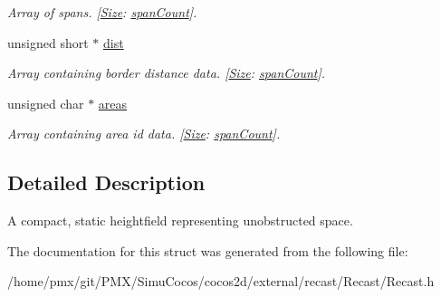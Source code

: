 \begin{DoxyCompactItemize}
\begin{DoxyCompactList}\small\item\em Array of spans. \mbox{[}\hyperlink{classSize}{Size}\+: \hyperlink{structrcCompactHeightfield_a7206a15efe8a9e2a8e28b8c7d89b45bd}{span\+Count}\mbox{]}. \end{DoxyCompactList}\item 
\mbox{\label{structrcCompactHeightfield_a91367763f0098a2966c4646ea676d880}} 
unsigned short $\ast$ \hyperlink{structrcCompactHeightfield_a91367763f0098a2966c4646ea676d880}{dist}
\begin{DoxyCompactList}\small\item\em Array containing border distance data. \mbox{[}\hyperlink{classSize}{Size}\+: \hyperlink{structrcCompactHeightfield_a7206a15efe8a9e2a8e28b8c7d89b45bd}{span\+Count}\mbox{]}. \end{DoxyCompactList}\item 
\mbox{\label{structrcCompactHeightfield_abacbf57f824f37c0d7af8268562df916}} 
unsigned char $\ast$ \hyperlink{structrcCompactHeightfield_abacbf57f824f37c0d7af8268562df916}{areas}
\begin{DoxyCompactList}\small\item\em Array containing area id data. \mbox{[}\hyperlink{classSize}{Size}\+: \hyperlink{structrcCompactHeightfield_a7206a15efe8a9e2a8e28b8c7d89b45bd}{span\+Count}\mbox{]}. \end{DoxyCompactList}\end{DoxyCompactItemize}


\subsection{Detailed Description}
A compact, static heightfield representing unobstructed space. 

The documentation for this struct was generated from the following file\+:\begin{DoxyCompactItemize}
\item 
/home/pmx/git/\+P\+M\+X/\+Simu\+Cocos/cocos2d/external/recast/\+Recast/Recast.\+h\end{DoxyCompactItemize}
